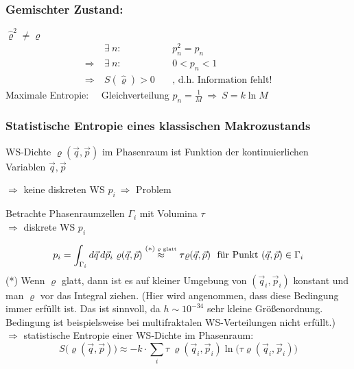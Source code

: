 \subsubsection*{Gemischter Zustand:}
$\hat{\varrho}^2 \neq \varrho$
\begin{align}
    &\exists \ n:  \ &&p_n^2 = p_n\\
    \Rightarrow \ &\exists \ n:  \ &&0 < p_n < 1 \\
    \Rightarrow \ &S(\hat{\varrho}) > 0 \ &&\text{, d.h. Information fehlt!}
\end{align}
Maximale Entropie: \ \ Gleichverteilung $p_n = \frac{1}{M} \ \Rightarrow \ S = k \ln M$

\subsubsection{Statistische Entropie eines klassischen Makrozustands}

WS-Dichte $\varrho ( \Vec{q}, \Vec{p})$ im Phasenraum ist Funktion der kontinuierlichen Variablen $\Vec{q}, \Vec{p}$

$\Rightarrow$ keine diskreten WS $p_i \ \Rightarrow$ Problem

Betrachte Phasenraumzellen $\Gamma_i$ mit Volumina $\tau$ \\
$\Rightarrow$ diskrete WS $p_i$

\begin{equation}
    p_i = \int_{\Gamma_i} d\Vec{q} \, d\Vec{p}_i \ \varrho (\Vec{q}, \Vec{p}) \overset{(*)\text{\tiny{ $\varrho$ glatt}}}{\approx} \tau \varrho (\Vec{q}, \Vec{p}) \ \text{ für Punkt } (\Vec{q}, \Vec{p}) \in \Gamma_i
\end{equation}
(*) Wenn $\varrho$ glatt, dann ist es auf kleiner Umgebung von $(\Vec{q}_i,\Vec{p}_i)$ konstant und man $\varrho $ vor das Integral ziehen. (Hier wird angenommen, dass diese Bedingung immer erfüllt ist. Das ist sinnvoll, da $ h \sim 10^{-34}$ sehr kleine Größenordnung. \\
Bedingung ist beispielsweise bei multifraktalen WS-Verteilungen nicht erfüllt.)\\

$\Rightarrow$ statistische Entropie einer WS-Dichte im Phasenraum: \\
\begin{equation}
    S\bigl(\varrho(\Vec{q}, \Vec{p})\bigr) \approx -k \cdot\sum_i \tau \ \varrho(\Vec{q}_i,\Vec{p}_i)\ln \bigl(\tau \varrho (\Vec{q}_i, \Vec{p}_i)\bigr)
\end{equation}

